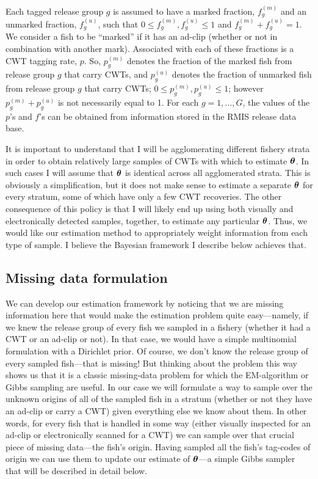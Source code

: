 \documentclass[11pt]{article}
\def\bm#1{\mathpalette\bmstyle{#1}}
\def\bmstyle#1#2{\mbox{\boldmath$#1#2$}}
\newcommand{\btheta}{\bm{\theta}}
\begin{document}
Each tagged release group $g$ is assumed to have a marked fraction, $f^{(m)}_g$ and an unmarked fraction, $f^{(u)}_g$, 
such that $0 \leq f^{(m)}_g, f^{(u)}_g \leq 1$ and $f^{(m)}_g + f^{(u)}_g = 1$.  We consider a fish to be ``marked'' if it has an ad-clip (whether or
not in combination with another mark).   Associated with each of these fractions is a CWT tagging rate, $p$.  So, $p^{(m)}_g$ denotes the
fraction of the marked fish from release group $g$ that carry CWTs, and $p^{(u)}_g$ denotes the fraction
of unmarked fish from release group $g$ that carry CWTs; $0 \leq p^{(m)}_g, p^{(u)}_g \leq 1$;
however $p^{(m)}_g + p^{(u)}_g$ is not necessarily equal to 1.  For each $g=1,\ldots,G$, the values of the $p$'s and $f$'s can be obtained
from information stored in the RMIS release data base.


It is important to understand that I will be agglomerating different fishery strata in order to obtain
relatively large samples of CWTs with which to estimate $\btheta$.  In such cases I will assume that
$\btheta$ is identical across all agglomerated strata.  This is obviously a simplification, but it does not make 
sense to estimate a separate $\btheta$ for every stratum, some of which have only a few CWT recoveries.
The other consequence
of this policy is that I will likely end up using both visually and electronically detected samples, together, to 
estimate any particular $\btheta$.  Thus, we would like our estimation method to
appropriately weight information from each type of sample.  I believe the Bayesian framework I
describe below achieves that.

\subsection{Missing data formulation}
We can develop our estimation framework by noticing that we are missing information here
that would make the estimation problem quite easy---namely, if we knew the release group of every
fish we sampled in a fishery (whether it had a CWT or an ad-clip or not).  In that case, we would have a simple multinomial
formulation with a Dirichlet prior.  Of course, we don't know the release group of every sampled
fish---that is missing!  But thinking about the problem this way shows us that it is a classic
missing-data problem for which the EM-algorithm or Gibbs sampling are useful.  In our case we will
formulate a way to sample over the unknown origins of all of the sampled fish in a stratum (whether or 
not they have an ad-clip or carry a CWT) given 
everything else we know about them.
In other words, for every fish that is handled in some way (either visually inspected for an ad-clip or
electronically scanned for a CWT) we can sample over that crucial piece of missing data---the fish's origin.
Having sampled all the fish's tag-codes of origin we can use them to update our estimate of
$\btheta$---a simple Gibbs sampler that will be described in detail below.
\end{document}
